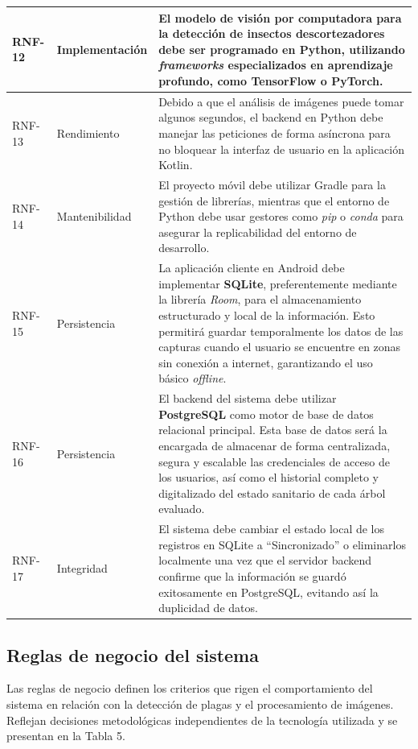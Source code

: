 \begin{longtable}{|>{\centering\arraybackslash}m{1.8cm}|>{\centering\arraybackslash}m{2.5cm}|m{9.5cm}|}
\hline
RNF-12 & Implementación & El modelo de visión por computadora para la detección de insectos descortezadores debe ser programado en Python, utilizando \textit{frameworks} especializados en aprendizaje profundo, como TensorFlow o PyTorch. \\
\hline
RNF-13 & Rendimiento & Debido a que el análisis de imágenes puede tomar algunos segundos, el backend en Python debe manejar las peticiones de forma asíncrona para no bloquear la interfaz de usuario en la aplicación Kotlin. \\
\hline
RNF-14 & Mantenibilidad & El proyecto móvil debe utilizar Gradle para la gestión de librerías, mientras que el entorno de Python debe usar gestores como \textit{pip} o \textit{conda} para asegurar la replicabilidad del entorno de desarrollo. \\
\hline
RNF-15 & Persistencia & La aplicación cliente en Android debe implementar \textbf{SQLite}, preferentemente mediante la librería \textit{Room}, para el almacenamiento estructurado y local de la información. Esto permitirá guardar temporalmente los datos de las capturas cuando el usuario se encuentre en zonas sin conexión a internet, garantizando el uso básico \textit{offline}. \\
\hline
RNF-16 & Persistencia & El backend del sistema debe utilizar \textbf{PostgreSQL} como motor de base de datos relacional principal. Esta base de datos será la encargada de almacenar de forma centralizada, segura y escalable las credenciales de acceso de los usuarios, así como el historial completo y digitalizado del estado sanitario de cada árbol evaluado. \\
\hline
RNF-17 & Integridad & El sistema debe cambiar el estado local de los registros en SQLite a ``Sincronizado'' o eliminarlos localmente una vez que el servidor backend confirme que la información se guardó exitosamente en PostgreSQL, evitando así la duplicidad de datos. \\
\hline
\end{longtable}

\subsection{Reglas de negocio del sistema}
Las reglas de negocio definen los criterios que rigen el comportamiento del sistema en relación con la detección de plagas y el procesamiento de imágenes. Reflejan decisiones metodológicas independientes de la tecnología utilizada y se presentan en la Tabla 5.

